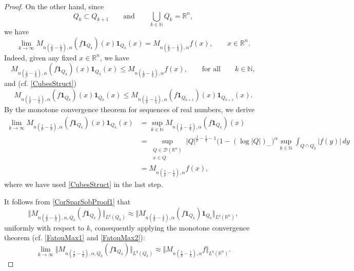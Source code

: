 \documentclass[10pt,a4paper]{amsart}
\begin{document}
\begin{proof}
On the other hand, since
\begin{equation}
\label{CubesStruct}Q_{k} \subset Q_{k+1} \qquad\text{and} \qquad\bigcup_{k
\in\mathbb{N}} Q_{k} = \mathbb{R}^{n},
\end{equation}
we have
\begin{equation}
\label{FatouMax1}\lim_{k \to\infty} M_{n (\frac{1}{p} - \frac{1}{q}), \alpha}
(f \mathbf{1}_{Q_{k}}) (x) \mathbf{1}_{Q_{k}} (x) = M_{n (\frac{1}{p} -
\frac{1}{q}), \alpha} f (x), \qquad x \in\mathbb{R}^{n}.
\end{equation}
Indeed, given any fixed $x \in\mathbb{R}^{n}$, we have
\[
M_{n (\frac{1}{p} - \frac{1}{q}), \alpha} (f \mathbf{1}_{Q_{k}}) (x)
\mathbf{1}_{Q_{k}} (x) \leq M_{n (\frac{1}{p} - \frac{1}{q}), \alpha} f (x),
\qquad\text{for all} \qquad k \in\mathbb{N},
\]
and (cf. \eqref{CubesStruct})
\begin{equation}
\label{FatouMax2}M_{n (\frac{1}{p} - \frac{1}{q}), \alpha} (f \mathbf{1}%
_{Q_{k}}) (x) \mathbf{1}_{Q_{k}} (x) \leq M_{n (\frac{1}{p} - \frac{1}{q}),
\alpha} (f \mathbf{1}_{Q_{k+1}}) (x) \mathbf{1}_{Q_{k+1}} (x).
\end{equation}
By the monotone convergence theorem for sequences of real numbers, we derive
\begin{align*}
\lim_{k \to\infty} M_{n (\frac{1}{p} - \frac{1}{q}), \alpha} (f \mathbf{1}%
_{Q_{k}}) (x) \mathbf{1}_{Q_{k}} (x)  &  = \sup_{k \in\mathbb{N}} M_{n
(\frac{1}{p} - \frac{1}{q}), \alpha} (f \mathbf{1}_{Q_{k}}) (x)\\
&  = \sup_{\substack{Q\in\mathcal{D}(\mathbb{R}^{n})\\x\in Q}}
|Q|^{\frac{1}{p}-\frac{1}{q}-1} \big(1- (\log|Q|)_{-} \big)^{\alpha} \sup_{k
\in\mathbb{N}} \int_{Q \cap Q_{k}}|f(y)| \,dy\\
&  = M_{n (\frac{1}{p} - \frac{1}{q}), \alpha} f (x),
\end{align*}
where we have used \eqref{CubesStruct} in the last step.

It follows from \eqref{CorSparSobProof1} that
\[
\Vert M_{n(\frac{1}{p}-\frac{1}{q}),\alpha,Q_{k}}(f\mathbf{1}_{Q_{k}}%
)\Vert_{L^{q}(Q_{k})}\approx\Vert M_{n(\frac{1}{p}-\frac{1}{q}),\alpha
}(f\mathbf{1}_{Q_{k}})\mathbf{1}_{Q_{k}}\Vert_{L^{q}(\mathbb{R}^{n})},
\]
uniformly with respect to $k$, consequently applying the monotone convergence
theorem (cf. \eqref{FatouMax1} and \eqref{FatouMax2}):
\begin{equation}
\lim_{k\rightarrow\infty}\Vert M_{n(\frac{1}{p}-\frac{1}{q}),\alpha,Q_{k}%
}(f\mathbf{1}_{Q_{k}})\Vert_{L^{q}(Q_{k})}\approx\Vert M_{n(\frac{1}{p}%
-\frac{1}{q}),\alpha}f\Vert_{L^{q}(\mathbb{R}^{n})}. \label{FatouMax3}%
\end{equation}



\end{proof}
\end{document}
